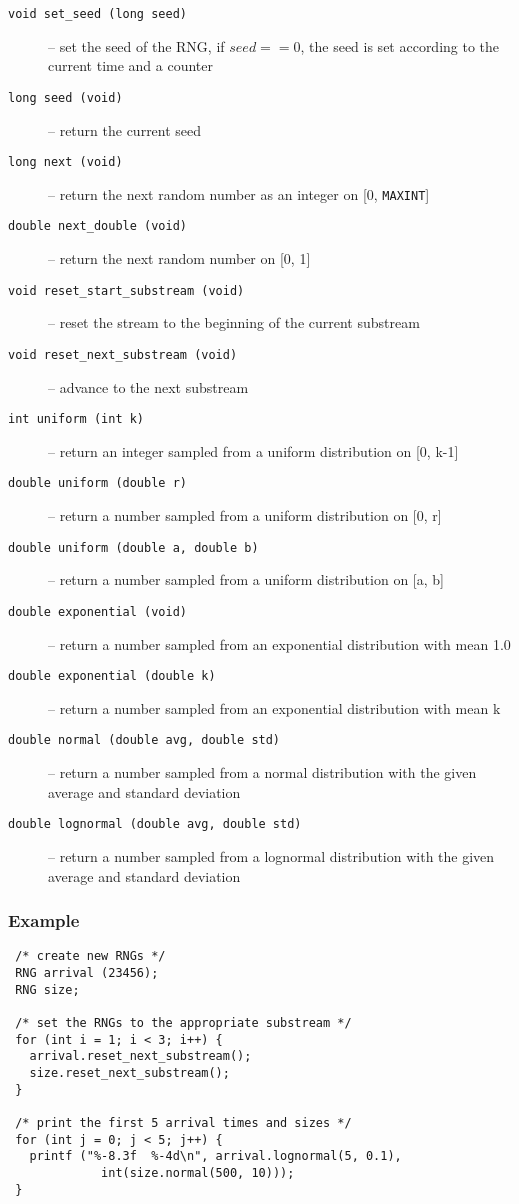 \begin{description}
    \item[{\tt void set\_seed (long seed)}] -- set the seed of the RNG, if
    $seed == 0$, the seed is set according to the current time and a
    counter
    \item[{\tt long seed (void)}] -- return the current seed
    \item[{\tt long next (void)}] -- return the next random number as an
    integer on [0, {\tt MAXINT}]
    \item[{\tt double next\_double (void)}] -- return the next random number
    on [0, 1]
    \item[{\tt void reset\_start\_substream (void)}] -- reset the stream
    to the beginning of the current substream
    \item[{\tt void reset\_next\_substream (void)}] -- advance to the next
    substream
    \item[{\tt int uniform (int k)}] -- return an integer sampled from a
      uniform distribution on [0, k-1]
    \item[{\tt double uniform (double r)}] -- return a number sampled from a
      uniform distribution on [0, r]
    \item[{\tt double uniform (double a, double b)}] -- return a number
      sampled from a uniform distribution on [a, b]
    \item[{\tt double exponential (void)}] -- return a number sampled from an
    exponential distribution with mean 1.0
    \item[{\tt double exponential (double k)}] -- return a number sampled from
      an exponential distribution with mean k 
    \item[{\tt double normal (double avg, double std)}] -- return a number
      sampled from a normal distribution with the given average and standard 
    deviation
    \item[{\tt double lognormal (double avg, double std)}] -- return a number
      sampled from a lognormal distribution with the given average and
      standard deviation
\end{description}

\subsubsection{Example}

\begin{verbatim}
 /* create new RNGs */
 RNG arrival (23456);
 RNG size;

 /* set the RNGs to the appropriate substream */
 for (int i = 1; i < 3; i++) {
   arrival.reset_next_substream();
   size.reset_next_substream();
 }

 /* print the first 5 arrival times and sizes */
 for (int j = 0; j < 5; j++) {
   printf ("%-8.3f  %-4d\n", arrival.lognormal(5, 0.1),
             int(size.normal(500, 10)));
 }
\end{verbatim}

